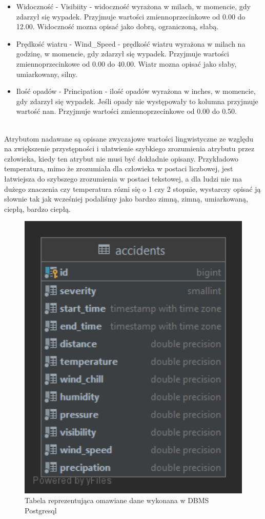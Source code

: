 \documentclass{classrep}
\begin{document}
\begin{itemize}
\item Widoczność - Visibiity - widoczność wyrażona w milach, w momencie, gdy zdarzył się wypadek. Przyjmuje wartości zmiennoprzecinkowe od 0.00 do 12.00. 
Widoczność mozna opisać jako dobrą, ograniczoną, słabą.
\item Prędkość wiatru - Wind\_Speed - prędkość wiatru wyrażona w milach na godzinę,  w momencie, gdy zdarzył się wypadek. Przyjmuje wartości zmiennoprzecinkowe od 0.00 do 40.00. Wiatr mozna opisać jako słaby, umiarkowany, silny.
\item Ilość opadów - Principation - ilość opadów wyrażona w inches, w momencie, gdy zdarzył się wypadek. Jeśli opady nie występowały to kolumna przyjmuje wartość nan.  Przyjmuje wartości zmiennoprzecinkowe od 0.00 do 0.50.
\end{itemize}
\ \\
Atrybutom nadawane są opisane zwyczajowe wartości lingwistyczne ze względu na zwiększenie przystępności i ułatwienie szybkiego zrozumienia atrybutu przez człowieka, kiedy ten atrybut nie musi być dokładnie opisany.
Przykładowo temperatura, mimo że zrozumiała dla człowieka w postaci liczbowej, jest łatwiejsza do szybszego zrozumienia w postaci tekstowej, a dla ludzi nie ma dużego znaczenia czy temperatura rózni się o 1 czy 2 stopnie, wystarczy opisać ją słownie tak jak wcześniej podaliśmy jako  bardzo zimną, zimną, umiarkowaną, ciepłą, bardzo ciepłą.

\newpage
\begin{figure}[h!]
 \centering
 \includegraphics[width=14cm]{accidents.png}
 \vspace{-0.3cm}
 \caption{Tabela reprezentująca omawiane dane wykonana w DBMS Postgresql}
 \label{Wynik klasyfikacji.}
\end{figure}
\newpage
\end{document}
